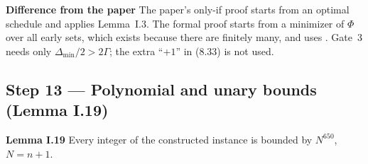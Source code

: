 \documentclass[11pt]{article}
\newcommand{\paperlabel}[1]{{\sffamily\bfseries\small\color{paperrule!80!black}#1}\quad}
\newcommand{\notelabel}[1]{{\sffamily\bfseries\small\color{noterule}#1}\quad}
\begin{document}
\begin{notebox}
\notelabel{Difference from the paper}
The paper's only-if proof starts from an optimal schedule and applies Lemma~I.3. The formal
proof starts from a minimizer of $\Phi$ over all early sets, which exists because there are
finitely many, and uses . Gate~3 needs only $\Delta_{\min}/2>2\Gamma$; the extra
``$+1$'' in (8.33) is not used.
\end{notebox}

\subsection{Step 13 --- Polynomial and unary bounds (Lemma I.19)}\label{step:size}

\begin{paperbox}
\paperlabel{Lemma I.19}
Every integer of the constructed instance is bounded by $N^{650}$, $N=n+1$.
\end{paperbox}
\end{document}
